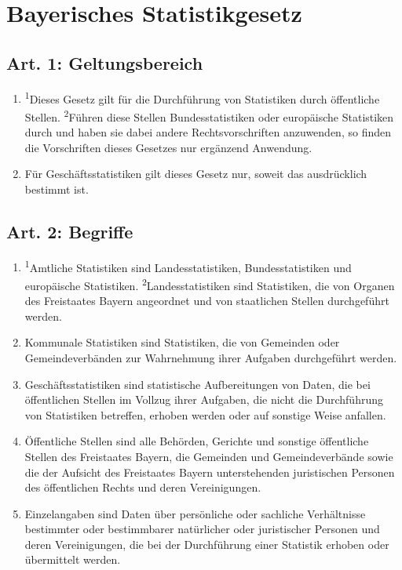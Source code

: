 \chapter[BayStatG]{Bayerisches Statistikgesetz}
\minitoc
    \section{Art. 1: Geltungsbereich}
        \begin{enumerate}[label=(\arabic*)]
            \item \textsuperscript{1}Dieses Gesetz gilt für die Durchführung von Statistiken durch öffentliche Stellen. \textsuperscript{2}Führen diese Stellen Bundesstatistiken oder europäische Statistiken durch und haben sie dabei andere Rechtsvorschriften anzuwenden, so finden die Vorschriften dieses Gesetzes nur ergänzend Anwendung.
            \item Für Geschäftsstatistiken gilt dieses Gesetz nur, soweit das ausdrücklich bestimmt ist.
        \end{enumerate}
    \section{Art. 2: Begriffe}
        \begin{enumerate}[label=(\arabic*)]
            \item \textsuperscript{1}Amtliche Statistiken sind Landesstatistiken, Bundesstatistiken und europäische Statistiken. \textsuperscript{2}Landesstatistiken sind Statistiken, die von Organen des Freistaates Bayern angeordnet und von staatlichen Stellen durchgeführt werden.
            \item Kommunale Statistiken sind Statistiken, die von Gemeinden oder Gemeindever\-bän\-den zur Wahrnehmung ihrer Aufgaben durchgeführt werden.
            \item Geschäftsstatistiken sind statistische Aufbereitungen von Daten, die bei öffentli\-chen Stellen im Vollzug ihrer Aufgaben, die nicht die Durchführung von Statistiken betreffen, erhoben werden oder auf sonstige Weise anfallen.
            \item Öffentliche Stellen sind alle Behörden, Gerichte und sonstige öffentliche Stellen des Freistaates Bayern, die Gemeinden und Gemeindeverbände sowie die der Aufsicht des Freistaates Bayern unterstehenden juristischen Personen des öffentlichen Rechts und deren Vereinigungen.
            \item Einzelangaben sind Daten über persönliche oder sachliche Verhältnisse bestimmter oder bestimmbarer natürlicher oder juristischer Personen und deren Vereinigungen, die bei der Durchführung einer Statistik erhoben oder übermittelt werden.
        \end{enumerate}
